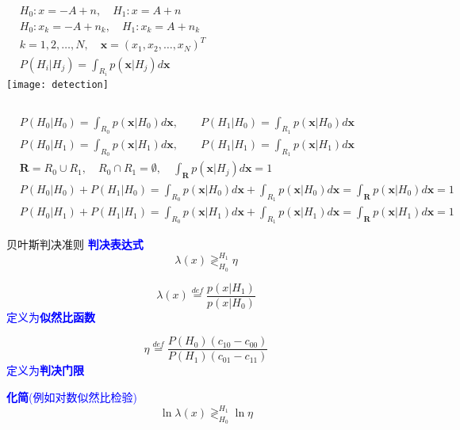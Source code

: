 \begin{frame}
\begin{columns}
	\begin{align*}
	&H_0: x=-A+n,\quad H_1: x=A+n\\
	&H_0: x_k=-A+n_k,\quad H_1: x_k=A+n_k\\
	&k=1,2,\dots,N,\quad \bm{x}=(x_1,x_2,\dots,x_N)^{T}\\
	&P(H_i|H_j)=\int_{R_i}p(\bm{x}|H_j)d\bm{x}
	\end{align*}
		\texttt{[image: detection]}
\end{columns}
\begin{align*}
&P(H_0|H_0)=\int_{R_0}p(\bm{x}|H_0)d\bm{x},\qquad P(H_1|H_0)=\int_{R_1}p(\bm{x}|H_0)d\bm{x}\\
&P(H_0|H_1)=\int_{R_0}p(\bm{x}|H_1)d\bm{x},\qquad P(H_1|H_1)=\int_{R_1}p(\bm{x}|H_1)d\bm{x}\\
&\bm{R}=R_0\cup R_1,\quad R_0\cap R_1=\emptyset, \quad \int_{\bm{R}}p(\bm{x}|H_j)d\bm{x}=1\\
&P(H_0|H_0)+P(H_1|H_0)=\int_{R_0}p(\bm{x}|H_0)d\bm{x}+\int_{R_1}p(\bm{x}|H_0)d\bm{x}=\int_{\bm{R}}p(\bm{x}|H_0)d\bm{x}=1\\
&P(H_0|H_1)+P(H_1|H_1)=\int_{R_0}p(\bm{x}|H_1)d\bm{x}+\int_{R_1}p(\bm{x}|H_1)d\bm{x}=\int_{\bm{R}}p(\bm{x}|H_1)d\bm{x}=1
\end{align*}
\end{frame}

\begin{frame}{贝叶斯判决准则}
\textcolor{blue}{\textbf{判决表达式}}
\[
\lambda(x)\mathop{\gtrless}_{H_0}^{H_1}\eta
\]

\[ \lambda(x)\mathop{=}\limits^{def}\frac{p(x|H_1)}{p(x|H_0)} \] \textcolor{blue}{定义为\textbf{似然比函数}}

\bigskip
\[\eta\mathop{=}\limits^{def}\frac{P(H_0)(c_{10}-c_{00})}{P(H_1)(c_{01}-c_{11})} \] \textcolor{blue}{定义为\textbf{判决门限}}

\bigskip
\textcolor{blue}{\textbf{化简}(例如对数似然比检验)}
\[
\ln\lambda(x)\mathop{\gtrless}_{H_0}^{H_1}\ln\eta
\]

\end{frame}

